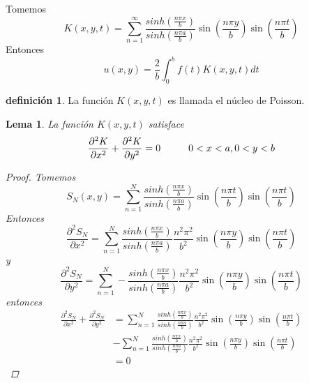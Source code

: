 \documentclass[11pt]{book}
\theoremstyle{plain}
\newtheorem{lema}[proposición]{Lema}
\theoremstyle{definition}
\newtheorem{defi}[proposición]{definición}
\begin{document}
    Tomemos
    \[
        K(x,y,t) = \sum_{n=1}^{\infty} \frac{sinh\left(\frac{n\pi x}{b}\right)}{sinh\left(\frac{n\pi a}{b}\right)}\sin\left(\frac{n\pi y}{b}\right)\sin\left(\frac{n\pi t}{b}\right)
    \]
    Entonces
    \[
        u(x,y) = \frac{2}{b}\int_{0}^{b} f(t)K(x,y,t)dt
    \]
    \begin{defi}
        La función $K(x,y,t)$ es llamada el núcleo de Poisson.
    \end{defi}
    \begin{lema}
        La función $K(x,y,t)$ satisface
        \[
            \frac{\partial^{2}K}{\partial x^{2}} + \frac{\partial^{2}K}{\partial y^{2}} = 0 \hspace{10mm} 0<x<a, 0<y<b
        \]
        \begin{proof}
            Tomemos
            \[
                S_{N}(x,y) = \sum_{n=1}^{N} \frac{sinh\left(\frac{n\pi x}{b}\right)}{sinh\left(\frac{n\pi a}{b}\right)}\sin\left(\frac{n\pi t}{b}\right)\sin\left(\frac{n\pi t}{b}\right)
            \]
            Entonces
            \[
                \frac{\partial^{2}S_{N}}{\partial x^{2}} = \sum_{n=1}^{N} \frac{sinh\left(\frac{n\pi x}{b}\right)}{sinh\left(\frac{n\pi a}{b}\right)}\frac{n^{2}\pi^{2}}{b^{2}}\sin\left(\frac{n\pi y}{b}\right)\sin\left(\frac{n\pi t}{b}\right)
            \]
            y
            \[
                \frac{\partial^{2}S_{N}}{\partial y^{2}} = \sum_{n=1}^{N} -\frac{sinh\left(\frac{n\pi x}{b}\right)}{sinh\left(\frac{n\pi a}{b}\right)}\frac{n^{2}\pi^{2}}{b^{2}}\sin\left(\frac{n\pi y}{b}\right)\sin\left(\frac{n\pi t}{b}\right)
            \]
            entonces
            \begin{align*}
                \frac{\partial^{2}S_{N}}{\partial x^{2}} + \frac{\partial^{2}S_{N}}{\partial y^{2}} &= \sum_{n=1}^{N} \frac{sinh\left(\frac{n\pi x}{b}\right)}{sinh\left(\frac{n\pi a}{b}\right)}\frac{n^{2}\pi^{2}}{b^{2}}\sin\left(\frac{n\pi y}{b}\right)\sin\left(\frac{n\pi t}{b}\right)\\
                &- \sum_{n=1}^{N} \frac{sinh\left(\frac{n\pi x}{b}\right)}{sinh\left(\frac{n\pi a}{b}\right)}\frac{n^{2}\pi^{2}}{b^{2}}\sin\left(\frac{n\pi y}{b}\right)\sin\left(\frac{n\pi t}{b}\right)\\
                &= 0    
            \end{align*}
        \end{proof}
    \end{lema}
\end{document}
